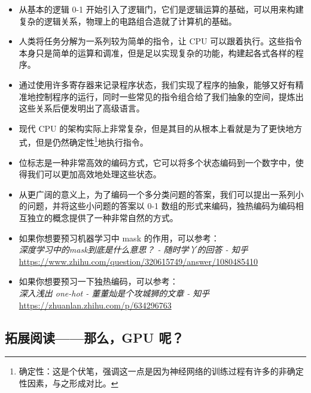 \begin{itemize}
    \item 从基本的逻辑 0-1 开始引入了逻辑门，它们是逻辑运算的基础，可以用来构建复杂的逻辑关系，物理上的电路组合造就了计算机的基础。
    \item 人类将任务分解为一系列较为简单的指令，让 CPU 可以跟着执行。这些指令本身只是简单的运算和调准，但是足以实现复杂的功能，构建起各式各样的程序。
    \item 通过使用许多寄存器来记录程序状态，我们实现了程序的抽象，能够又好有精准地控制程序的运行，同时一些常见的指令组合给了我们抽象的空间，提炼出这些关系后便发明出了高级语言。
    \item 现代 CPU 的架构实际上非常复杂，但是其目的从根本上看就是为了更快地方式，但是仍然确定性\footnote{确定性：这是个伏笔，强调这一点是因为神经网络的训练过程有许多的非确定性因素，与之形成对比。}地执行指令。
    \item 位标志是一种非常高效的编码方式，它可以将多个状态编码到一个数字中，使得我们可以更加高效地处理这些状态。
    \item 从更广阔的意义上，为了编码一个多分类问题的答案，我们可以提出一系列小的问题，并将这些小问题的答案以 0-1 数组的形式来编码，独热编码为编码相互独立的概念提供了一种非常自然的方式。
\end{itemize}


\begin{tcolorbox}[myrecommendbox, title=推荐阅读, breakable=false]
    \begin{itemize}
        \item 如果你想要预习机器学习中 mask 的作用，可以参考：\\
              \textit{深度学习中的mask到底是什么意思？ - 随时学丫的回答 - 知乎}\\
              \url{https://www.zhihu.com/question/320615749/answer/1080485410}
        \item 如果你想要预习一下独热编码，可以参考：\\
              \textit{深入浅出 one-hot - 董董灿是个攻城狮的文章 - 知乎}\\
              \url{https://zhuanlan.zhihu.com/p/634296763}
    \end{itemize}
\end{tcolorbox}

\newpage

\subsection*{拓展阅读——那么，GPU 呢？}

